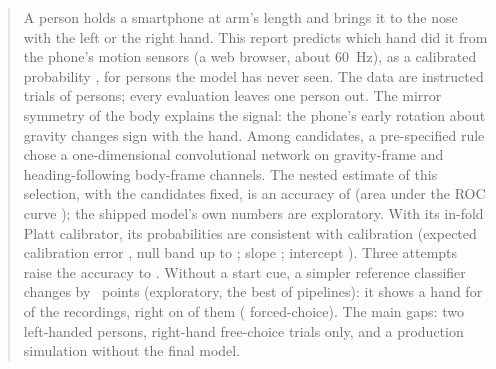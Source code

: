 \begin{abstract}
\noindent A person holds a smartphone at arm's length and brings it to the nose with the left or the right hand.
This report predicts which hand did it from the phone's motion sensors (a web browser, about 60~Hz), as a
calibrated probability \pright{}, for persons the model has never seen. The data are 
instructed trials of  persons; every evaluation leaves one person out. The mirror symmetry of
the body explains the signal: the phone's early rotation about gravity changes sign with the hand. Among
 candidates, a pre-specified rule chose a one-dimensional convolutional network on
gravity-frame and heading-following body-frame channels. The nested estimate of this selection, with the candidates
fixed, is an accuracy of  (area under the ROC curve ); the shipped
model's own numbers are exploratory. With its in-fold Platt calibrator, its probabilities are consistent with
calibration (expected calibration error , null band up to ;
slope ; intercept ). Three attempts raise the accuracy
to . Without a start cue, a simpler reference classifier changes by
~points (exploratory, the best of  pipelines): it shows a hand for
 of the recordings, right on  of them
( forced-choice). The main gaps: two left-handed persons, right-hand free-choice trials only,
and a production simulation without the final model.
\end{abstract}


